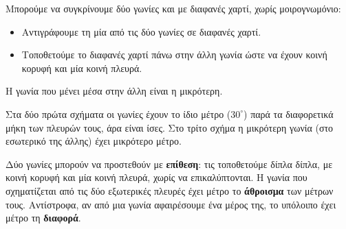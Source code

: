 Μπορούμε να συγκρίνουμε δύο γωνίες και με διαφανές χαρτί, χωρίς μοιρογνωμόνιο:
\begin{itemize}[leftmargin=1.2em,itemsep=0.3ex,topsep=2pt]
\item Αντιγράφουμε τη μία από τις δύο γωνίες σε διαφανές χαρτί.
\item Τοποθετούμε το διαφανές χαρτί πάνω στην άλλη γωνία ώστε να έχουν κοινή κορυφή και μία κοινή πλευρά.
\end{itemize}
Η γωνία που μένει μέσα στην άλλη είναι η μικρότερη.

\begin{center}
\end{center}

Στα δύο πρώτα σχήματα οι γωνίες έχουν το ίδιο μέτρο ($30^\circ$) παρά τα διαφορετικά μήκη των πλευρών τους, άρα είναι ίσες. Στο τρίτο σχήμα η μικρότερη γωνία (στο εσωτερικό της άλλης) έχει μικρότερο μέτρο.


Δύο γωνίες μπορούν να προστεθούν με \textbf{επίθεση}: τις τοποθετούμε δίπλα δίπλα, με κοινή κορυφή και μία κοινή πλευρά, χωρίς να επικαλύπτονται. Η γωνία που σχηματίζεται από τις δύο εξωτερικές πλευρές έχει μέτρο το \textbf{άθροισμα} των μέτρων τους. Αντίστροφα, αν από μια γωνία αφαιρέσουμε ένα μέρος της, το υπόλοιπο έχει μέτρο τη \textbf{διαφορά}.

\begin{center}
\end{center}

